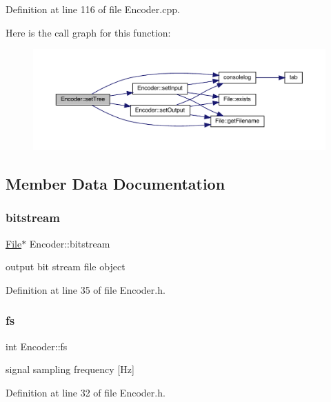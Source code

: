 Definition at line 116 of file Encoder.\+cpp.

Here is the call graph for this function\+:
\nopagebreak
\begin{figure}[H]
\begin{center}
\leavevmode
\includegraphics[width=350pt]{class_encoder_adc879a1000d99660b36d7369e00f4f06_cgraph}
\end{center}
\end{figure}


\subsection{Member Data Documentation}
\mbox{\label{class_encoder_a8cd18343fe80007dba58b4d716227544}} 
\subsubsection{\texorpdfstring{bitstream}{bitstream}}
{\footnotesize\ttfamily \hyperlink{class_file}{File}$\ast$ Encoder\+::bitstream}

output bit stream file object 

Definition at line 35 of file Encoder.\+h.

\mbox{\label{class_encoder_aa0549b597ab8fda7191f2e659a56044b}} 
\subsubsection{\texorpdfstring{fs}{fs}}
{\footnotesize\ttfamily int Encoder\+::fs}

signal sampling frequency \mbox{[}Hz\mbox{]} 

Definition at line 32 of file Encoder.\+h.

\mbox{\label{class_encoder_aa851a11113fd12d5cfa04a4a72013157}} 
